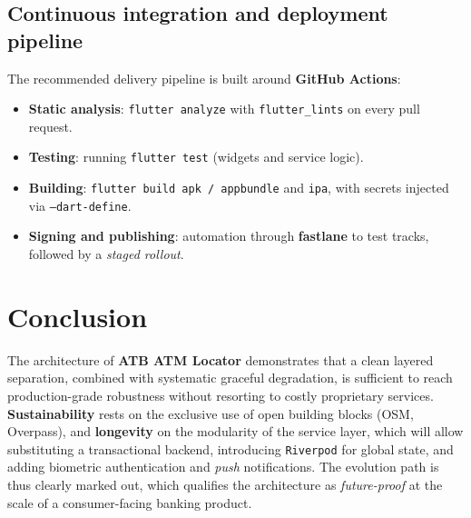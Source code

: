 \documentclass[11pt,a4paper]{article}
\newcommand{\code}[1]{\texttt{#1}}
\begin{document}
\subsection{Continuous integration and deployment pipeline}
The recommended delivery pipeline is built around \textbf{GitHub Actions}:
\begin{itemize}[leftmargin=1.4em]
  \item \textbf{Static analysis}: \code{flutter analyze} with \code{flutter\_lints}
  on every pull request.
  \item \textbf{Testing}: running \code{flutter test} (widgets and service
  logic).
  \item \textbf{Building}: \code{flutter build apk\,/\,appbundle} and \code{ipa},
  with secrets injected via \code{--dart-define}.
  \item \textbf{Signing and publishing}: automation through \textbf{fastlane} to
  test tracks, followed by a \emph{staged rollout}.
\end{itemize}

\section{Conclusion}
The architecture of \textbf{ATB ATM Locator} demonstrates that a clean layered
separation, combined with systematic graceful degradation, is sufficient to
reach production-grade robustness without resorting to costly proprietary
services. \textbf{Sustainability} rests on the exclusive use of open building
blocks (OSM, Overpass), and \textbf{longevity} on the modularity of the service
layer, which will allow substituting a transactional backend, introducing
\code{Riverpod} for global state, and adding biometric authentication and
\emph{push} notifications. The evolution path is thus clearly marked out, which
qualifies the architecture as \emph{future-proof} at the scale of a
consumer-facing banking product.
\end{document}
